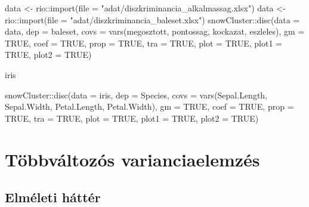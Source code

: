 \documentclass[
  letterpaper,
]{krantz}
\makeatletter
\newenvironment{Shaded}{\begin{snugshade}}{\end{snugshade}}
\newcommand{\AttributeTok}[1]{\textcolor[rgb]{0.40,0.45,0.13}{#1}}
\newcommand{\ConstantTok}[1]{\textcolor[rgb]{0.56,0.35,0.01}{#1}}
\newcommand{\FunctionTok}[1]{\textcolor[rgb]{0.28,0.35,0.67}{#1}}
\newcommand{\NormalTok}[1]{\textcolor[rgb]{0.00,0.23,0.31}{#1}}
\newcommand{\OtherTok}[1]{\textcolor[rgb]{0.00,0.23,0.31}{#1}}
\newcommand{\SpecialCharTok}[1]{\textcolor[rgb]{0.37,0.37,0.37}{#1}}
\newcommand{\StringTok}[1]{\textcolor[rgb]{0.13,0.47,0.30}{#1}}
\newenvironment{kframe}{%
\medskip{}
\setlength{\fboxsep}{.8em}
 \def\at@end@of@kframe{}%
 \ifinner\ifhmode%
  \def\at@end@of@kframe{\end{minipage}}%
  \begin{minipage}{\columnwidth}%
 \fi\fi%
 \def\FrameCommand##1{\hskip\@totalleftmargin \hskip-\fboxsep
 \colorbox{shadecolor}{##1}\hskip-\fboxsep
     \hskip-\linewidth \hskip-\@totalleftmargin \hskip\columnwidth}%
 \MakeFramed {\advance\hsize-\width
   \@totalleftmargin\z@ \linewidth\hsize
   \@setminipage}}%
 {\par\unskip\endMakeFramed%
 \at@end@of@kframe}
\renewenvironment{Shaded}{\begin{kframe}}{\end{kframe}}
\makeatother
\begin{document}
\begin{Shaded}
\begin{Highlighting}[]
\NormalTok{data }\OtherTok{\textless{}{-}}\NormalTok{ rio}\SpecialCharTok{::}\FunctionTok{import}\NormalTok{(}\AttributeTok{file =} \StringTok{"adat/diszkriminancia\_alkalmassag.xlsx"}\NormalTok{)}
\NormalTok{data }\OtherTok{\textless{}{-}}\NormalTok{ rio}\SpecialCharTok{::}\FunctionTok{import}\NormalTok{(}\AttributeTok{file =} \StringTok{"adat/diszkriminancia\_baleset.xlsx"}\NormalTok{)}
\NormalTok{snowCluster}\SpecialCharTok{::}\FunctionTok{disc}\NormalTok{(}\AttributeTok{data =}\NormalTok{ data, }\AttributeTok{dep =}\NormalTok{ baleset, }\AttributeTok{covs =} \FunctionTok{vars}\NormalTok{(megosztott,}
\NormalTok{    pontossag, kockazat, eszleles), }\AttributeTok{gm =} \ConstantTok{TRUE}\NormalTok{, }\AttributeTok{coef =} \ConstantTok{TRUE}\NormalTok{, }\AttributeTok{prop =} \ConstantTok{TRUE}\NormalTok{,}
    \AttributeTok{tra =} \ConstantTok{TRUE}\NormalTok{, }\AttributeTok{plot =} \ConstantTok{TRUE}\NormalTok{, }\AttributeTok{plot1 =} \ConstantTok{TRUE}\NormalTok{, }\AttributeTok{plot2 =} \ConstantTok{TRUE}\NormalTok{)}


\NormalTok{iris}





\NormalTok{snowCluster}\SpecialCharTok{::}\FunctionTok{disc}\NormalTok{(}\AttributeTok{data =}\NormalTok{ iris, }\AttributeTok{dep =}\NormalTok{ Species, }\AttributeTok{covs =} \FunctionTok{vars}\NormalTok{(Sepal.Length,}
\NormalTok{    Sepal.Width, Petal.Length, Petal.Width), }\AttributeTok{gm =} \ConstantTok{TRUE}\NormalTok{, }\AttributeTok{coef =} \ConstantTok{TRUE}\NormalTok{,}
    \AttributeTok{prop =} \ConstantTok{TRUE}\NormalTok{, }\AttributeTok{tra =} \ConstantTok{TRUE}\NormalTok{, }\AttributeTok{plot =} \ConstantTok{TRUE}\NormalTok{, }\AttributeTok{plot1 =} \ConstantTok{TRUE}\NormalTok{, }\AttributeTok{plot2 =} \ConstantTok{TRUE}\NormalTok{)}
\end{Highlighting}
\end{Shaded}


\hypertarget{sec-tobbvaltozos-varianciaelemzes}{%
\chapter{Többváltozós
varianciaelemzés}\label{sec-tobbvaltozos-varianciaelemzes}}

\hypertarget{elmuxe9leti-huxe1ttuxe9r}{%
\section{Elméleti háttér}\label{elmuxe9leti-huxe1ttuxe9r}}
\end{document}
